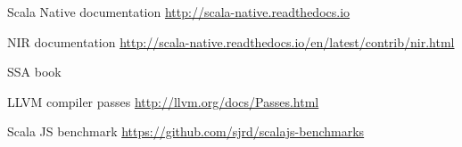 \documentclass[11pt,a4paper]{article}
\begin{document}
\begin{thebibliography}{9}

    Scala Native documentation \newline \url{http://scala-native.readthedocs.io}

	 NIR documentation \newline \url{http://scala-native.readthedocs.io/en/latest/contrib/nir.html}
	
	 SSA book
	
	 LLVM compiler passes \newline \url{http://llvm.org/docs/Passes.html}

	 Scala JS benchmark \newline \url{https://github.com/sjrd/scalajs-benchmarks}

\end{thebibliography}
\end{document}
